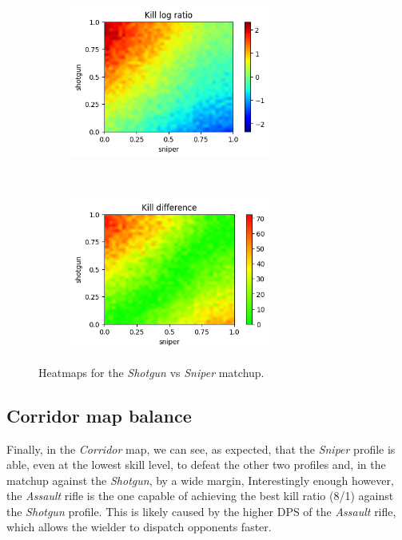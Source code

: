 \begin{figure}[H]
    \centering
    \begin{subfigure}[t]{0.5\textwidth}
        \centering
        \includegraphics[height=5cm]{Images/images/heatmaps/mid-range/shotgun_sniper_heatmap_ratio.png}
    \end{subfigure}%
    ~ 
    \begin{subfigure}[t]{0.5\textwidth}
        \centering
        \includegraphics[height=5cm]{Images/images/heatmaps/mid-range/shotgun_sniper_heatmap_diff.png}
    \end{subfigure}
    \caption{Heatmaps for the \textit{Shotgun} vs \textit{Sniper} matchup.}
    \label{fig:balance_shotgun_sniper_mid}
\end{figure}


\subsection{Corridor map balance}

Finally, in the \textit{Corridor} map, we can see, as expected, that the \textit{Sniper} profile is able, even at the lowest skill level, to defeat the other two profiles and, in the matchup against the \textit{Shotgun}, by a wide margin,
Interestingly enough however, the \textit{Assault} rifle is the one capable of achieving the best kill ratio (8/1) against the \textit{Shotgun} profile. This is likely caused by the higher DPS of the \textit{Assault} rifle, which allows the wielder to dispatch opponents faster.

